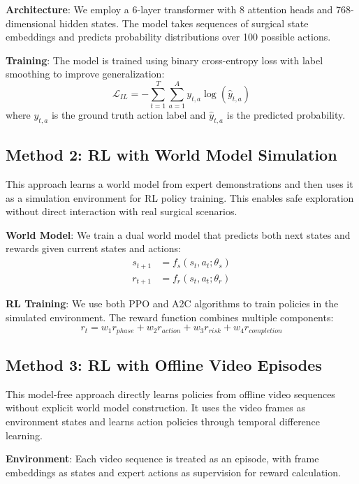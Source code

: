 \documentclass[conference]{IEEEtran}
\begin{document}
\textbf{Architecture}: We employ a 6-layer transformer with 8 attention heads and 768-dimensional hidden states. The model takes sequences of surgical state embeddings and predicts probability distributions over 100 possible actions.

\textbf{Training}: The model is trained using binary cross-entropy loss with label smoothing to improve generalization:
\begin{equation}
\mathcal{L}_{IL} = -\sum_{t=1}^{T} \sum_{a=1}^{A} y_{t,a} \log(\hat{y}_{t,a})
\end{equation}
where $y_{t,a}$ is the ground truth action label and $\hat{y}_{t,a}$ is the predicted probability.

\subsection{Method 2: RL with World Model Simulation}

This approach learns a world model from expert demonstrations and then uses it as a simulation environment for RL policy training. This enables safe exploration without direct interaction with real surgical scenarios.

\textbf{World Model}: We train a dual world model that predicts both next states and rewards given current states and actions:
\begin{align}
s_{t+1} &= f_s(s_t, a_t; \theta_s) \\
r_{t+1} &= f_r(s_t, a_t; \theta_r)
\end{align}

\textbf{RL Training}: We use both PPO and A2C algorithms to train policies in the simulated environment. The reward function combines multiple components:
\begin{equation}
r_t = w_1 r_{phase} + w_2 r_{action} + w_3 r_{risk} + w_4 r_{completion}
\end{equation}

\subsection{Method 3: RL with Offline Video Episodes}

This model-free approach directly learns policies from offline video sequences without explicit world model construction. It uses the video frames as environment states and learns action policies through temporal difference learning.

\textbf{Environment}: Each video sequence is treated as an episode, with frame embeddings as states and expert actions as supervision for reward calculation.
\end{document}
